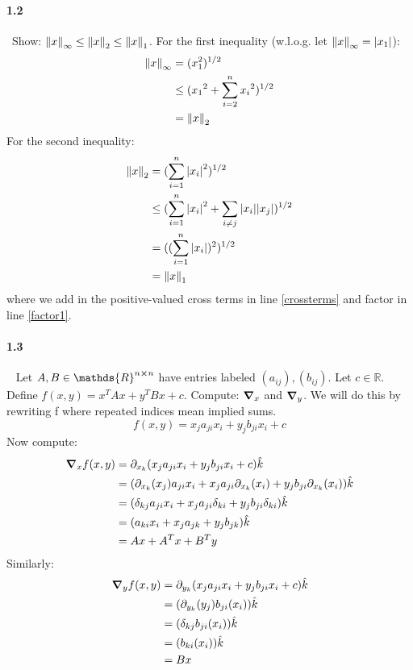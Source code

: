 \documentclass{article}
\begin{document}
\paragraph{1.2}\ Show: $\norm{x}_\infty \le \norm{x}_2 \le \norm{x}_1$. \newline
For the first inequality (w.l.o.g. let $\norm{x}_\infty=\abs{x_1}$):
\begin{align}
    \norm{x}_\infty
    &=(x_1^2)^{1/2} \\
    &\le ({x_1}^2 + \sum_{i=2}^{n}{x_i}^2)^{1/2} \\
    &= \norm{x}_2
\end{align}
For the second inequality:
\begin{align}
    \norm{x}_2 
    &=(\sum _{i=1}^{n}{\abs{x_i}^{2}})^{1/2} \\
    &\le (\sum _{i=1}^{n}{\abs{x_i}^{2}} + \sum _{i\ne j}{\abs{x_i}\abs{x_j}})^{1/2} \label{crossterms} \\
    &=((\sum _{i=1}^{n}{\abs{x_i}})^2)^{1/2} \label{factor1} \\
    &= \norm{x}_1
\end{align}
where we add in the positive-valued cross terms in line \ref{crossterms} and factor in line \ref{factor1}.

\paragraph{1.3}\ \newline
Let $A,B \in \mathds{R}^{n \cross n}$ have entries labeled $(a_{ij}), (b_{ij})$. Let $c \in \mathds{R}$. Define $f(x,y)=x^T A x + y^T B x + c$. Compute: $\grad_x$ and $\grad_y$. We will do this by rewriting f where repeated indices mean implied sums.
\begin{equation}
    f(x,y) = x_j a_{ji} x_i + y_j b_{ji} x_i + c
\end{equation}
Now compute:
\begin{align}
    \grad_x f(x,y) 
    &= \partial_{x_k}( x_j a_{ji} x_i  + y_j b_{ji} x_i + c ) \hat{k} \\
    &= (\partial_{x_k}( x_j ) a_{ji} x_i + x_j a_{ji} \partial_{x_k}(x_i) + y_j b_{ji} \partial_{x_k}(x_i)) \hat{k} \\
    &= (\delta_{kj} a_{ji} x_i + x_j a_{ji} \delta_{ki} + y_j b_{ji} \delta_{ki}) \hat{k} \\
    &= (a_{ki} x_i + x_j a_{jk} + y_j b_{jk}) \hat{k} \\
    &= A x + A^T x + B^T y
\end{align}
Similarly:
\begin{align}
    \grad_y f(x,y) 
    &= \partial_{y_k}( x_j a_{ji} x_i  + y_j b_{ji} x_i + c ) \hat{k} \\
    &= (\partial_{y_k}(y_j) b_{ji} (x_i)) \hat{k} \\
    &= (\delta_{kj} b_{ji} (x_i)) \hat{k} \\
    &= (b_{ki} (x_i)) \hat{k} \\
    &= B x
\end{align}
\end{document}
